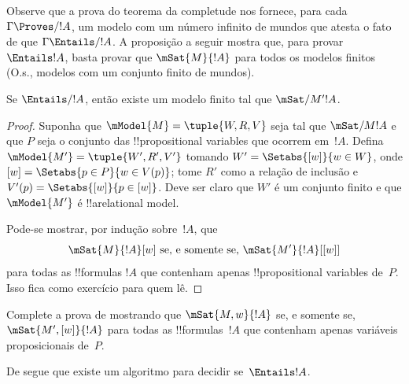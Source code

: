 \documentclass[../../../include/open-logic-section]{subfiles}
\begin{document}

Observe que a prova do teorema da completude nos fornece, para cada
$\Gamma \Proves/ !A$, um modelo com um número infinito de mundos que
atesta o fato de que $\Gamma \Entails/ !A$. A proposição a seguir
mostra que, para provar $\Entails !A$, basta provar
que $\mSat{M}{!A}$ para todos os modelos finitos (O.s.\@, modelos com um
conjunto finito de mundos).

\begin{thm}
  Se $\Entails/ !A$, então existe um modelo finito tal que $\mSat/{M'}{!A}$.
\end{thm}

\begin{proof}
  Suponha que $\mModel{M}=\tuple{W, R, V}$ seja tal que $\mSat/{M}{!A}$ e que $P$ 
  seja o conjunto das !!{propositional variable}s que ocorrem em~$!A$. Defina
  $\mModel{M'}=\tuple{W', R', V'}$ tomando $W' = \Setabs{[w]}{w \in W}$, 
  onde $[w] = \Setabs{p \in P}{w \in V(p)}$; tome $R'$ como a relação de inclusão 
  e $V'(p)=\Setabs{[w]}{p \in [w]}$. Deve ser claro que $W'$ é um 
  conjunto finito e que $\mModel{M'}$ é !!a{relational model}.

  Pode-se mostrar, por indução sobre~$!A$, que 
  \[
    \mSat{M}{!A}[w] \text{ se, e somente se, } \mSat{M'}{!A}[{[w]}]
  \]
  para todas as !!{formula}s $!A$ que contenham apenas !!{propositional variable}s
  de~$P$. Isso fica como exercício para quem lê.
\end{proof}

\begin{prob}
Complete a prova de  mostrando
que $\mSat{M,w}{!A}$ se, e somente se, $\mSat{M',[w]}{!A}$ para todas as !!{formula}s~$!A$
que contenham apenas variáveis proposicionais de~$P$. 
\end{prob}

De  segue que existe um algoritmo para
decidir se~$\Entails !A$.
\end{document}
